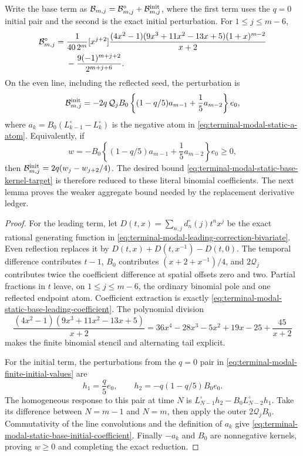 \begin{lemma}
\label{lem:terminal-modal-static-base-interface}
Write the base term as
$\mathcal B_{m,j}=\mathcal B_{m,j}^\circ+\mathcal B_{m,j}^{\rm init}$,
where the first term uses the $q=0$ initial pair and the second is the exact
initial perturbation.  For $1\le j\le m-6$,
\begin{align}
 \mathcal B_{m,j}^\circ
 ={}&\frac1{40\,2^m}[x^{j+2}]
 \frac{(4x^2-1)(9x^3+11x^2-13x+5)(1+x)^{m-2}}{x+2}\notag\\
 &-\frac{9(-1)^{m+j+2}}{2^{m+j+6}}.
 \label{eq:terminal-modal-static-base-leading-coefficient}
\end{align}
On the even line, including the reflected seed, the perturbation is
\begin{equation}
 \mathcal B_{m,j}^{\rm init}
 =-2q\,\mathcal Q_jB_0
 \left\{(1-q/5)a_{m-1}+\frac15a_{m-2}\right\}e_0,
 \label{eq:terminal-modal-static-base-initial-coefficient}
\end{equation}
where $a_k=B_0(L_{k-1}^\circ-L_k^\circ)$ is the negative atom in
\eqref{eq:terminal-modal-static-a-atom}.  Equivalently, if
\[
 w=-B_0\left\{(1-q/5)a_{m-1}+\frac15a_{m-2}\right\}e_0\ge0,
\]
then $\mathcal B_{m,j}^{\rm init}=2q(w_j-w_{j+2}/4)$.
The desired bound
\eqref{eq:terminal-modal-static-base-kernel-target} is therefore reduced to
these literal binomial coefficients.  The next lemma proves the weaker
aggregate bound needed by the replacement derivative ledger.
\end{lemma}

\begin{proof}
For the leading term, let
$D(t,x)=\sum_{n,j}d_n^\circ(j)t^nx^j$ be the exact rational generating
function in \eqref{eq:terminal-modal-leading-correction-bivariate}.  Even
reflection replaces it by
$D(t,x)+D(t,x^{-1})-D(t,0)$.  The temporal difference contributes $t-1$,
$B_0$ contributes $(x+2+x^{-1})/4$, and $2\mathcal Q_j$ contributes twice
the coefficient difference at spatial offsets zero and two.  Partial
fractions in $t$ leave, on $1\le j\le m-6$, the ordinary binomial pole and
one reflected endpoint atom.  Coefficient extraction is exactly
\eqref{eq:terminal-modal-static-base-leading-coefficient}.  The polynomial
division
\begin{equation}
 \frac{(4x^2-1)(9x^3+11x^2-13x+5)}{x+2}
 =36x^4-28x^3-5x^2+19x-25+\frac{45}{x+2}
 \label{eq:terminal-modal-static-base-polynomial-division}
\end{equation}
makes the finite binomial stencil and alternating tail explicit.

For the initial term, the perturbations from the $q=0$ pair in
\eqref{eq:terminal-modal-finite-initial-values} are
\[
 h_1=\frac q5e_0,
 \qquad h_2=-q(1-q/5)B_0e_0.
\]
The homogeneous response to this pair at time $N$ is
$L_{N-1}^\circ h_2-B_0L_{N-2}^\circ h_1$.  Take its difference between
$N=m-1$ and $N=m$, then apply the outer $2\mathcal Q_jB_0$.  Commutativity
of the line convolutions and the definition of $a_k$ give
\eqref{eq:terminal-modal-static-base-initial-coefficient}.  Finally
$-a_k$ and $B_0$ are nonnegative kernels, proving $w\ge0$ and completing
the exact reduction.
\end{proof}

